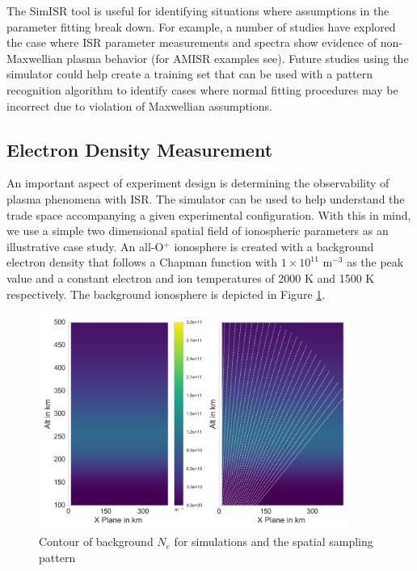 The SimISR tool is useful for identifying situations where assumptions in the parameter fitting break down. For example, a number of studies have explored the case where ISR parameter measurements and spectra show evidence of non-Maxwellian plasma behavior (for AMISR examples see)\cite{Akbari:2012dz,Akbari:2015fv}. Future studies using the simulator could help create a training set that can be used with a pattern recognition algorithm to identify cases where normal fitting procedures may be incorrect due to violation of Maxwellian assumptions.

\subsection{Electron Density Measurement}
An important aspect of experiment design is determining the observability of plasma phenomena with ISR. The simulator can be used to help understand the trade space accompanying a given experimental configuration. With this in mind, we use a simple two dimensional spatial field of ionospheric parameters as an illustrative case study. An all-O$^+$ ionosphere is created with a background electron density that follows a Chapman function with $1\times10^{11}$ m$^{-3}$ as the peak value and a constant electron and ion temperatures of 2000 K and 1500 K respectively. The background ionosphere is depicted in Figure \ref{fig:background1}.

\begin{figure}[!t]
\centering
\includegraphics[width=4in]{backgroundandsamp}
\caption{Contour of background $N_e$ for simulations and the spatial sampling pattern}
\label{fig:background1}
\end{figure}

